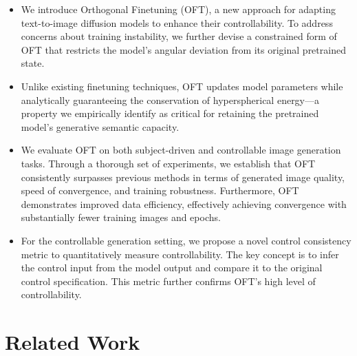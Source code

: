 \begin{itemize}[leftmargin=*,nosep]

    \item We introduce Orthogonal Finetuning (OFT), a new approach for adapting text-to-image diffusion models to enhance their controllability. To address concerns about training instability, we further devise a constrained form of OFT that restricts the model's angular deviation from its original pretrained state.
    \item Unlike existing finetuning techniques, OFT updates model parameters while analytically guaranteeing the conservation of hyperspherical energy—a property we empirically identify as critical for retaining the pretrained model's generative semantic capacity.
    \item We evaluate OFT on both subject-driven and controllable image generation tasks. Through a thorough set of experiments, we establish that OFT consistently surpasses previous methods in terms of generated image quality, speed of convergence, and training robustness. Furthermore, OFT demonstrates improved data efficiency, effectively achieving convergence with substantially fewer training images and epochs.
    \item For the controllable generation setting, we propose a novel control consistency metric to quantitatively measure controllability. The key concept is to infer the control input from the model output and compare it to the original control specification. This metric further confirms OFT's high level of controllability.
\end{itemize}

\section{Related Work}

